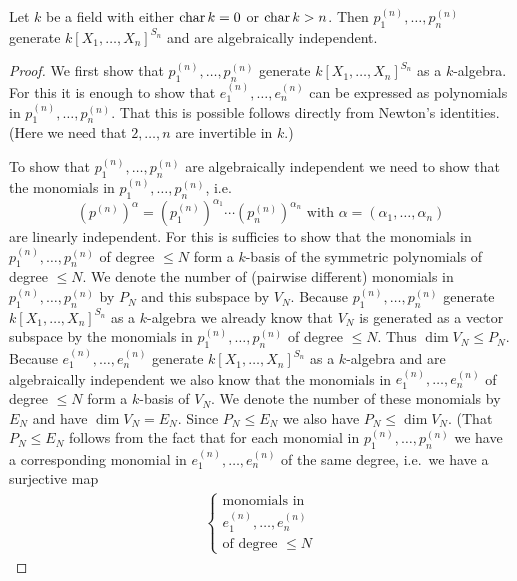 \begin{theorem}
  Let $k$ be a field with either $\operatorname{char} k = 0$ or $\operatorname{char} k > n$.
  Then $p^{(n)}_1, \dotsc, p^{(n)}_n$ generate $k[X_1, \dotsc, X_n]^{S_n}$ and are algebraically independent.
\end{theorem}
\begin{proof}
  We first show that $p^{(n)}_1, \dotsc, p^{(n)}_n$ generate $k[X_1, \dotsc, X_n]^{S_n}$ as a $k$-algebra.
  For this it is enough to show that $e^{(n)}_1, \dotsc, e^{(n)}_n$ can be expressed as polynomials in $p^{(n)}_1, \dotsc, p^{(n)}_n$.
  That this is possible follows directly from Newton’s identities.
  (Here we need that $2, \dotsc, n$ are invertible in $k$.)
  
  To show that $p^{(n)}_1, \dotsc, p^{(n)}_n$ are algebraically independent we need to show that the monomials in $p^{(n)}_1, \dotsc, p^{(n)}_n$, i.e.\
  \[
      \left(p^{(n)}\right)^\alpha
    = \left(p^{(n)}_1\right)^{\alpha_1} \dotsm \left(p^{(n)}_n\right)^{\alpha_n}
    \text{ with }
      \alpha
    = (\alpha_1, \dotsc, \alpha_n)
  \]
  are linearly independent.
  For this is sufficies to show that the monomials in $p^{(n)}_1, \dotsc, p^{(n)}_n$ of degree $\leq N$ form a $k$-basis of the symmetric polynomials of degree $\leq N$.
  We denote the number of (pairwise different) monomials in $p^{(n)}_1, \dotsc, p^{(n)}_n$ by $P_N$ and this subspace by $V_N$.
  Because $p^{(n)}_1, \dotsc, p^{(n)}_n$ generate $k[X_1, \dotsc, X_n]^{S_n}$ as a $k$-algebra we already know that $V_N$ is generated as a vector subspace by the monomials in $p^{(n)}_1, \dotsc, p^{(n)}_n$ of degree $\leq N$.
  Thus $\dim V_N \leq P_N$.
  Because $e^{(n)}_1, \dotsc, e^{(n)}_n$ generate $k[X_1, \dotsc, X_n]^{S_n}$ as a $k$-algebra and are algebraically independent we also know that the monomials in $e^{(n)}_1, \dotsc, e^{(n)}_n$ of degree $\leq N$ form a $k$-basis of $V_N$.
  We denote the number of these monomials by $E_N$ and have $\dim V_N = E_N$.
  Since $P_N \leq E_N$ we also have $P_N \leq \dim V_N$. (That $P_N \leq E_N$ follows from the fact that for each monomial in $p^{(n)}_1, \dotsc, p^{(n)}_n$ we have a corresponding monomial in $e^{(n)}_1, \dotsc, e^{(n)}_n$ of the same degree, i.e.\ we have a surjective map
\begin{align*}
  \left\{
    \begin{array}{c}
      \text{monomials in} \\
      e^{(n)}_1, \dotsc, e^{(n)}_n \\
      \text{of degree $\leq N$}
    \end{array}

\end{align*}
\end{proof}
